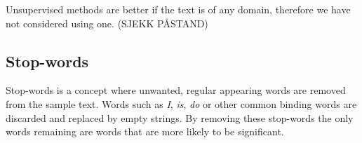 Unsupervised methods are better if the text is of any domain, therefore we have not considered using one. (SJEKK PÅSTAND)

\subsection{Stop-words}
Stop-words is a concept where unwanted, regular appearing words are removed from the sample text. Words such as \emph{I}, \emph{is}, \emph{do} or other common binding words are discarded and replaced by empty strings. By removing these stop-words the only words remaining are words that are more likely to be significant. 